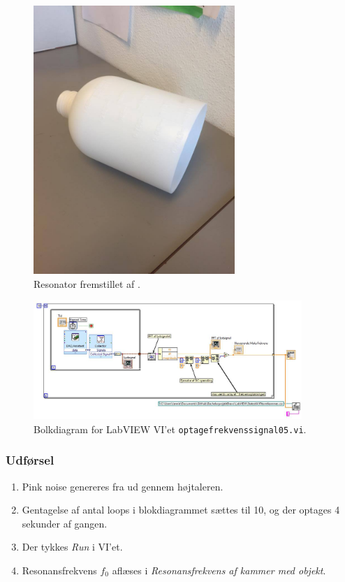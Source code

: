 	\begin{figure}
	\centering
	\includegraphics[width=3in]{resonator.jpg}
	\caption{Resonator fremstillet af .}
	\label{fig:resonator}	
	\end{figure}

	\begin{figure}
	\centering
	\includegraphics[width=4in]{optagefrekvenssignal05.jpeg}
	\caption{Bolkdiagram for LabVIEW VI'et \texttt{optagefrekvenssignal05.vi}.}
	\label{fig:optagefrekvenssignal05}	
	\end{figure}
	
	\subsubsection{Udførsel}
			
			\begin{enumerate}
			\item Pink noise genereres fra \onlineg  ud gennem højtaleren. 
			\item Gentagelse af antal loops i blokdiagrammet sættes til 10, og der optages 4 sekunder af gangen. 
			\item Der tykkes \textit{Run} i VI'et. 
			\item Resonansfrekvens $f_{0}$ aflæses i \textit{Resonansfrekvens af kammer med objekt}.
			\end{enumerate}
			
